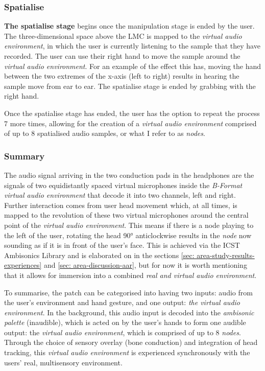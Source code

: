 \subsubsection{Spatialise}                      \label{sec: area-system-software-spatialise}
\textbf{The spatialise stage} begins once the manipulation stage is ended by the user. The three-dimensional space above the LMC is mapped to the \textit{virtual audio environment}, in which the user is currently listening to the sample that they have recorded. The user can use their right hand to move the sample around the \textit{virtual audio environment}. For an example of the effect this has, moving the hand between the two extremes of the x-axis (left to right) results in hearing the sample move from ear to ear. The spatialise stage is ended by grabbing with the right hand.

Once the spatialise stage has ended, the user has the option to repeat the process 7 more times, allowing for the creation of a \textit{virtual audio environment} comprised of up to 8 spatialised audio samples, or what I refer to as \textit{nodes}. 

\subsubsection{Summary}                         \label{sec: area-system-software-summary}
The audio signal arriving in the two conduction pads in the headphones are the signals of two equidistantly spaced virtual microphones inside the \textit{B-Format virtual audio environment} that decode it into two channels, left and right. Further interaction comes from user head movement which, at all times, is mapped to the revolution of these two virtual microphones around the central point of the \textit{virtual audio environment}. This means if there is a node playing to the left of the user, rotating the head 90° anticlockwise results in the \textit{node} now sounding as if it is in front of the user’s face. This is achieved via the ICST Ambisonics Library \citep{schacher2006} and is elaborated on in the sections \autoref{sec: area-study-results-experiences} and \autoref{sec: area-discussion-aar}, but for now it is worth mentioning that it allows for immersion into a combined \textit{real and virtual audio environment}.

To summarise, the patch can be categorised into having two inputs: audio from the user’s environment and hand gesture, and one output: \textit{the virtual audio environment}. In the background, this audio input is decoded into the \textit{ambisonic palette} (inaudible), which is acted on by the user’s hands to form one audible output: the \textit{virtual audio environment}, which is comprised of up to 8 \textit{nodes}. Through the choice of sensory overlay (bone conduction) and integration of head tracking, this \textit{virtual audio environment} is experienced synchronously with the users’ real, multisensory environment. 




